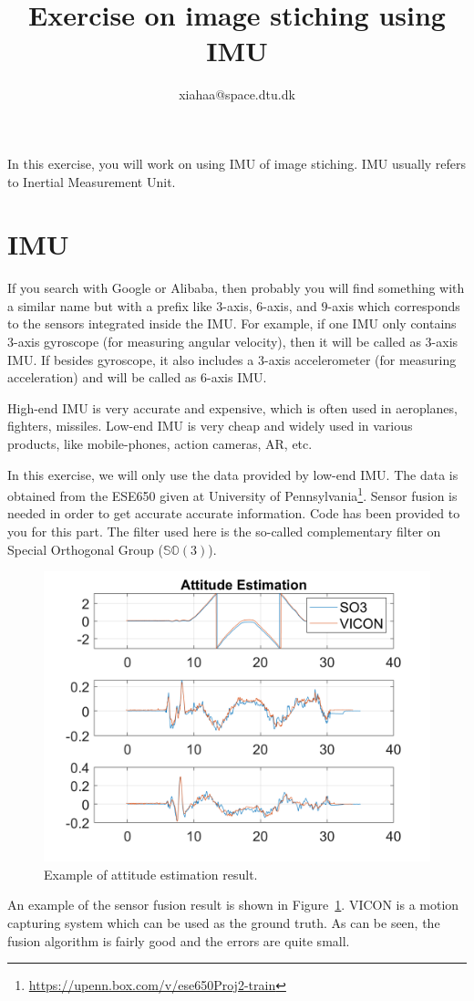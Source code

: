 \documentclass[a4paper]{article}
\begin{document}
\title{Exercise on image stiching using IMU}
\author{xiahaa@space.dtu.dk}
\maketitle%

In this exercise, you will work on using IMU of image stiching. IMU usually refers to Inertial Measurement Unit. 
\section{IMU}
If you search with Google or Alibaba, then probably you will find something with a similar name but with a prefix like $3$-axis, $6$-axis, and $9$-axis which corresponds to the sensors integrated inside the IMU. For example, if one IMU only contains $3$-axis gyroscope (for measuring angular velocity), then it will be called as $3$-axis IMU. If besides gyroscope, it also includes a $3$-axis accelerometer (for measuring acceleration) and will be called as $6$-axis IMU. 

High-end IMU is very accurate and expensive, which is often used in aeroplanes, fighters, missiles. Low-end IMU is very cheap and widely used in various products, like mobile-phones, action cameras, AR, etc.

In this exercise, we will only use the data provided by low-end IMU. The data is obtained from the ESE650 given at University of Pennsylvania\footnote{\url{https://upenn.box.com/v/ese650Proj2-train}}. Sensor fusion is needed in order to get accurate accurate information. Code has been provided to you for this part. The filter used here is the so-called complementary filter on Special Orthogonal Group ($\mathbb{SO}(3)$).
\begin{figure}[!b]
	\centering
	\includegraphics[scale=0.9]{figures/so3_1.png}
	\caption{Example of attitude estimation result.}
	\label{fig1}
\end{figure}
An example of the sensor fusion result is shown in Figure~\ref{fig1}. VICON is a motion capturing system which can be used as the ground truth. As can be seen, the fusion algorithm is fairly good and the errors are quite small.
\end{document}
